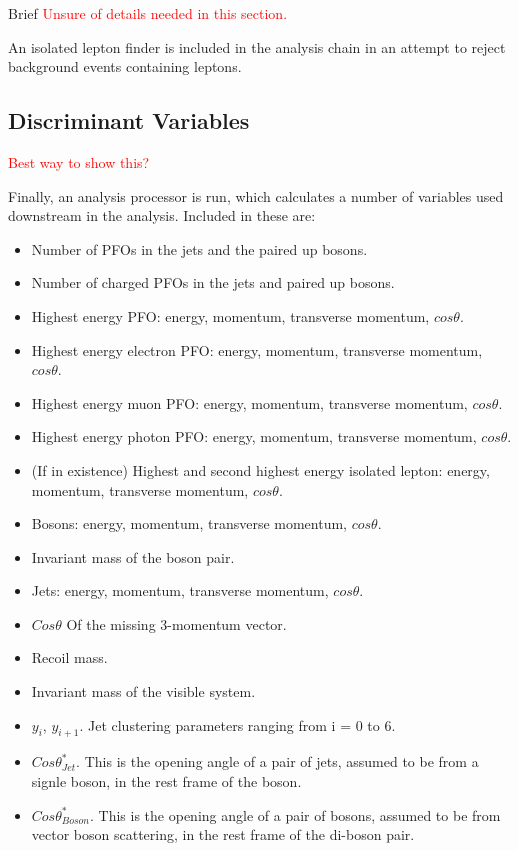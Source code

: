 Brief 
\textcolor{red}{Unsure of details needed in this section.}

An isolated lepton finder is included in the analysis chain in an attempt to reject background events containing leptons. 

\subsection{Discriminant Variables} 
\label{sec:analysisprocessor}
\textcolor{red}{Best way to show this?}

Finally, an analysis processor is run, which calculates a number of variables used downstream in the analysis. Included in these are:
\begin{itemize}
\item Number of PFOs in the jets and the paired up bosons.
\item Number of charged PFOs in the jets and paired up bosons.
\item Highest energy PFO: energy, momentum, transverse momentum, $cos\theta$.
\item Highest energy electron PFO: energy, momentum, transverse momentum, $cos\theta$.
\item Highest energy muon PFO: energy, momentum, transverse momentum, $cos\theta$.
\item Highest energy photon PFO: energy, momentum, transverse momentum, $cos\theta$.
\item (If in existence) Highest and second highest energy isolated lepton: energy, momentum, transverse momentum, $cos\theta$.
\item Bosons: energy, momentum, transverse momentum, $cos\theta$.
\item Invariant mass of the boson pair.
\item Jets: energy, momentum, transverse momentum, $cos\theta$.
\item $Cos\theta$ Of the missing 3-momentum vector.
\item Recoil mass.
\item Invariant mass of the visible system.
\item $y_{i}$, $y_{i+1}$. Jet clustering parameters ranging from i = 0 to 6.
\item $Cos\theta^{*}_{Jet}$.  This is the opening angle of a pair of jets, assumed to be from a signle boson, in the rest frame of the boson.
\item $Cos\theta^{*}_{Boson}$.  This is the opening angle of a pair of bosons, assumed to be from vector boson scattering, in the rest frame of the di-boson pair.

\end{itemize}
